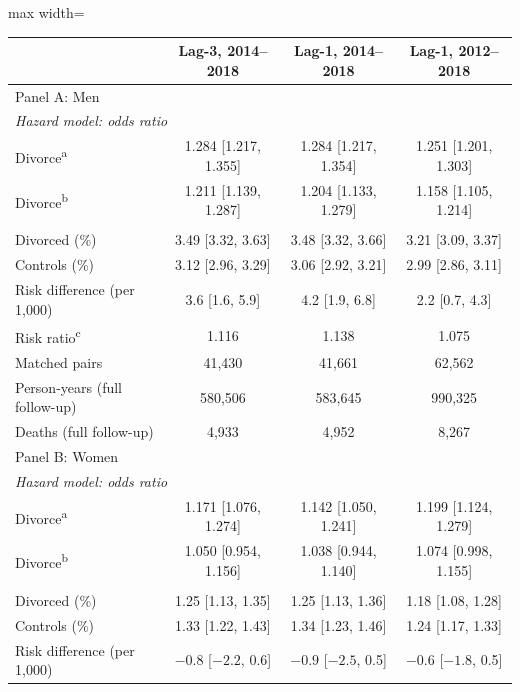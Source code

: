 \documentclass[a4paper,12pt]{article}
\theoremstyle{plain}
\theoremstyle{definition}
\theoremstyle{TheoremNum}
\theoremstyle{CorollaryNum}
\theoremstyle{PropositionNum}
\theoremstyle{TheoremNum}
\begin{document}
\begin{table}[H]
\centering
\small
\begin{adjustbox}{max width=\textwidth}
\begin{tabular}{@{}lccc@{}}
\toprule
 & Lag-3, 2014--2018 & Lag-1, 2014--2018 & Lag-1, 2012--2018 \\
\midrule
\multicolumn{4}{l}{Panel A: Men} \\ \hline
\multicolumn{4}{l}{\textit{Hazard model: odds ratio}} \\
Divorce\textsuperscript{a} & 1.284 [1.217, 1.355] & 1.284 [1.217, 1.354] & 1.251 [1.201, 1.303] \\
Divorce\textsuperscript{b} & 1.211 [1.139, 1.287] & 1.204 [1.133, 1.279] & 1.158 [1.105, 1.214] \\
\addlinespace
\multicolumn{4}{l}{\textit{Cumulative mortality at five years}} \\
Divorced (\%) & 3.49 [3.32, 3.63] & 3.48 [3.32, 3.66] & 3.21 [3.09, 3.37] \\
Controls (\%) & 3.12 [2.96, 3.29] & 3.06 [2.92, 3.21] & 2.99 [2.86, 3.11] \\
Risk difference (per 1,000) & 3.6 [1.6, 5.9] & 4.2 [1.9, 6.8] & 2.2 [0.7, 4.3] \\
Risk ratio\textsuperscript{c} & 1.116 & 1.138 & 1.075 \\
\addlinespace
\hline
Matched pairs & 41,430 & 41,661 & 62,562 \\
Person-years (full follow-up) & 580,506 & 583,645 & 990,325 \\
Deaths (full follow-up) & 4,933 & 4,952 & 8,267 \\
\midrule
\multicolumn{4}{l}{Panel B: Women} \\ \hline
\multicolumn{4}{l}{\textit{Hazard model: odds ratio}} \\
Divorce\textsuperscript{a} & 1.171 [1.076, 1.274] & 1.142 [1.050, 1.241] & 1.199 [1.124, 1.279] \\
Divorce\textsuperscript{b} & 1.050 [0.954, 1.156] & 1.038 [0.944, 1.140] & 1.074 [0.998, 1.155] \\
\addlinespace
\multicolumn{4}{l}{\textit{Cumulative mortality at five years}} \\
Divorced (\%) & 1.25 [1.13, 1.35] & 1.25 [1.13, 1.36] & 1.18 [1.08, 1.28] \\
Controls (\%) & 1.33 [1.22, 1.43] & 1.34 [1.23, 1.46] & 1.24 [1.17, 1.33] \\
Risk difference (per 1,000) & $-0.8$ [$-2.2$, 0.6] & $-0.9$ [$-2.5$, 0.5] & $-0.6$ [$-1.8$, 0.5] \\

\end{tabular}
\end{adjustbox}
\end{table}
\end{document}

